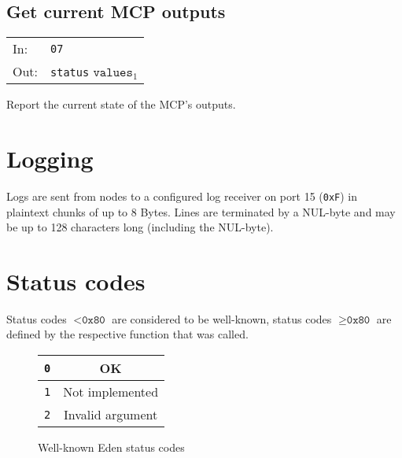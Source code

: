 \documentclass[a4paper]{scrartcl}
\newcommand{\EDEN}{{\sc Eden}}
\begin{document}
\subsection{Get current MCP outputs}
\begin{tabular}{ll}
  In: & \texttt{07} \\
  Out: & \texttt{status} $\texttt{values}_1$
\end{tabular}
\vspace{5pt}

Report the current state of the MCP's outputs.

\section{Logging}

Logs are sent from nodes to a configured log receiver on port 15 (\texttt{0xF}) in plaintext chunks
of up to 8 Bytes. Lines are terminated by a NUL-byte and may be up to 128 characters
long (including the NUL-byte).

\section{Status codes}

Status codes $< \texttt{0x80}$ are considered to be well-known,
status codes $\geq \texttt{0x80}$ are defined by the respective
function that was called.


\begin{figure}[h]
  \centering
  \begin{tabular}{|c|c|}
    \hline
    \texttt{0} & OK \\
    \hline
    \texttt{1} & Not implemented \\
    \hline
    \texttt{2} & Invalid argument \\
    \hline
  \end{tabular}
  
  \caption{Well-known \EDEN{} status codes}
\label{fig:eden-codes}
\end{figure}
\end{document}
